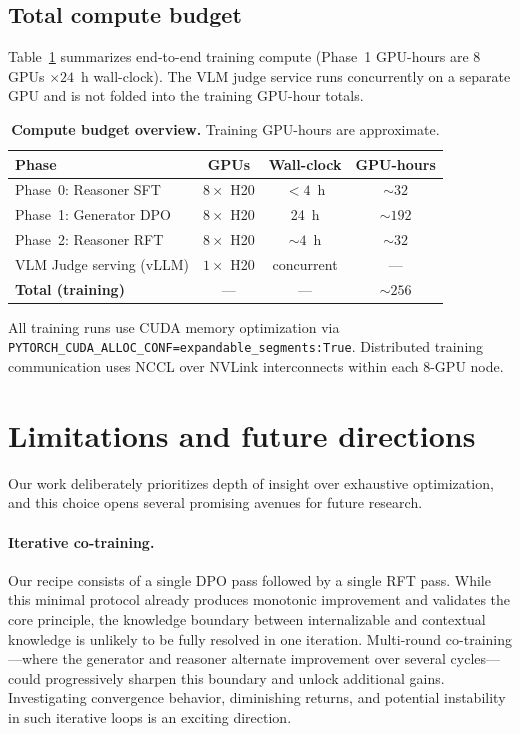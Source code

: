 \subsection{Total compute budget}
Table~\ref{tab:app_compute_budget} summarizes end-to-end training compute (Phase~1 GPU-hours are $8$ GPUs $\times 24$~h wall-clock).
The VLM judge service runs concurrently on a separate GPU and is not folded into the training GPU-hour totals.

\begin{table}[t]
  \centering
  \caption{\textbf{Compute budget overview.} Training GPU-hours are approximate.}
  \label{tab:app_compute_budget}
  \small
  \begin{tabular}{@{}lccc@{}}
    \toprule
    \textbf{Phase} & \textbf{GPUs} & \textbf{Wall-clock} & \textbf{GPU-hours} \\
    \midrule
    Phase~0: Reasoner SFT & $8 \times$ H20 & ${<}4$~h & ${\sim}32$ \\
    Phase~1: Generator DPO & $8 \times$ H20 & 24~h & ${\sim}192$ \\
    Phase~2: Reasoner RFT & $8 \times$ H20 & ${\sim}4$~h & ${\sim}32$ \\
    VLM Judge serving (vLLM) & $1 \times$ H20 & concurrent & --- \\
    \midrule
    \textbf{Total (training)} & --- & --- & \textbf{${\sim}256$} \\
    \bottomrule
  \end{tabular}
\end{table}

All training runs use CUDA memory optimization via \\
\texttt{PYTORCH\_CUDA\_ALLOC\_CONF=expandable\_segments:True}.
Distributed training communication uses NCCL over NVLink interconnects within each 8-GPU node.

\section{Limitations and future directions}
\label{app:limitations}
Our work deliberately prioritizes depth of insight over exhaustive optimization, and this choice opens several promising avenues for future research.

\paragraph{Iterative co-training.}
Our recipe consists of a single DPO pass followed by a single RFT pass.
While this minimal protocol already produces monotonic improvement and validates the core principle, the knowledge boundary between internalizable and contextual knowledge is unlikely to be fully resolved in one iteration.
Multi-round co-training---where the generator and reasoner alternate improvement over several cycles---could progressively sharpen this boundary and unlock additional gains.
Investigating convergence behavior, diminishing returns, and potential instability in such iterative loops is an exciting direction.

